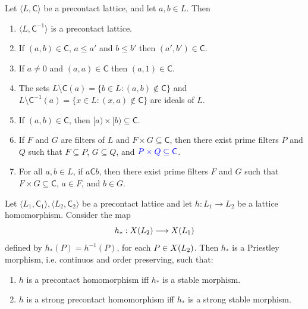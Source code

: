 \documentclass[10pt,a4paper]{amsart}
\begin{document}
\begin{lemma}\label{propp} Let $\langle L,\mathsf{C}\rangle$ be
a precontact lattice, and let $a,b\in L$. Then 
\begin{enumerate}
\item $\langle L,\mathsf{C}^{-1}\rangle$ is a precontact lattice. 
\item If $(a,b)\in\mathsf{C}$, $a\leq a'$ and $b\leq b'$ then $(a',b')\in\mathsf{C}$. 
\item If $a\neq0$ and $(a,a)\in\mathsf{C}$ then $(a,1)\in\mathsf{C}$. 
\item The sets $L\setminus\mathsf{C}(a)=\{b\in L:(a,b)\notin\mathsf{C}\}$
and $L\setminus\mathsf{C}^{-1}(a)=\{x\in L:(x,a)\notin\mathsf{C}\}$
are ideals of $L$. 
\item If $(a,b)\in\mathsf{C}$, then $[a)\times[b)\subseteq\mathsf{C}$. 
\item If $F$ and $G$ are filters of $L$ and $F\times G\subseteq\mathsf{C}$,
then there exist prime filters $P$ and $Q$ such that $F\subseteq P$,
$G\subseteq Q$, and $\textcolor{blue}{P\times Q \subseteq\mathsf{C}}$. 
\item For all $a,b\in L$, if $a\mathsf{C}b$, then there exist prime filters
$F$ and $G$ such that $F\times G\subseteq\mathsf{C}$, $a\in F$,
and $b\in G$. 
\end{enumerate}
\end{lemma} 

\begin{lemma} Let $\langle{L}_{1},\mathsf{C}_{1}\rangle,\langle{L}_{2},\mathsf{C}_{2}\rangle$
be a precontact lattice and let $h:{L}_{1}\longrightarrow{L}_{2}$
be a lattice homomorphism. Consider the map 
\[
h_{*}:{\rm {X}}(L_{2})\longrightarrow{\rm {X}}(L_{1})
\]
defined by $h_{*}(P)=h^{-1}(P)$, for each $P\in{\rm {X}}(L_{2})$.
Then $h_{*}$ is a Priestley morphism, i.e. continuos and order preserving,
such that: 
\begin{enumerate}
\item $h$ is a precontact homomorphism iff $h_{*}$ is a stable morphism. 
\item $h$ is a strong precontact homomorphism iff $h_{*}$ is a strong
stable morphism. 
\end{enumerate}
\end{lemma} 
\end{document}
